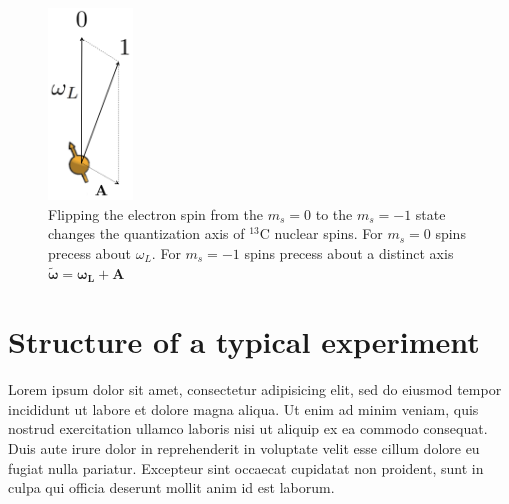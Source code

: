 \begin{figure}[htbp]
\centering
\includegraphics[keepaspectratio,width=0.2\textwidth,height=0.75\textheight]{./img/QuantizationAxis.png}
\caption{Flipping the electron spin from the  $m_s=0$ to the $m_s= -1$ state changes the quantization axis of $^{13}\mathrm{C}$ nuclear spins. For  $m_s=0$ spins precess about $\omega_L$. For  $m_s=-1$ spins precess about a distinct axis $\mathbf{\tilde{\omega}}=\mathbf{\omega_L} +\mathbf{A}$~\citep{Taminiau2012Detection}}
\label{fig:quantax}
\end{figure}


\section{Structure of a typical experiment}
Lorem ipsum dolor sit amet, consectetur adipisicing elit, sed do eiusmod
tempor incididunt ut labore et dolore magna aliqua. Ut enim ad minim veniam,
quis nostrud exercitation ullamco laboris nisi ut aliquip ex ea commodo
consequat. Duis aute irure dolor in reprehenderit in voluptate velit esse
cillum dolore eu fugiat nulla pariatur. Excepteur sint occaecat cupidatat non
proident, sunt in culpa qui officia deserunt mollit anim id est laborum.
